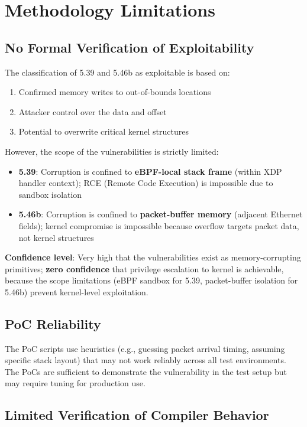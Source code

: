 \section{Methodology Limitations}

\subsection{No Formal Verification of Exploitability}

The classification of 5.39 and 5.46b as exploitable is based on:
\begin{enumerate}[label=\arabic*.]
  \item Confirmed memory writes to out-of-bounds locations
  \item Attacker control over the data and offset
  \item Potential to overwrite critical kernel structures
\end{enumerate}

However, the scope of the vulnerabilities is strictly limited:
\begin{itemize}
  \item \textbf{5.39}: Corruption is confined to \textbf{eBPF-local stack frame} (within XDP handler context); RCE (Remote Code Execution) is impossible due to sandbox isolation
  \item \textbf{5.46b}: Corruption is confined to \textbf{packet-buffer memory} (adjacent Ethernet fields); kernel compromise is impossible because overflow targets packet data, not kernel structures
\end{itemize}

\textbf{Confidence level}: Very high that the vulnerabilities exist as memory-corrupting primitives; \textbf{zero confidence} that privilege escalation to kernel is achievable, because the scope limitations (eBPF sandbox for 5.39, packet-buffer isolation for 5.46b) prevent kernel-level exploitation.

\subsection{PoC Reliability}

The PoC scripts use heuristics (e.g., guessing packet arrival timing, assuming specific stack layout) that may not work reliably across all test environments. The PoCs are sufficient to demonstrate the vulnerability in the test setup but may require tuning for production use.

\subsection{Limited Verification of Compiler Behavior}

